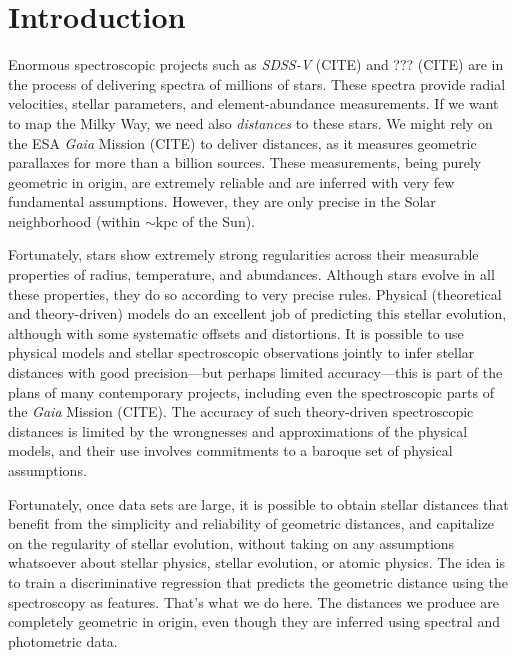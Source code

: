 \documentclass[modern]{aastex631}
\newcommand{\acronym}[1]{{\small{#1}}}
\newcommand{\project}[1]{\textsl{#1}}
\newcommand{\Gaia}{\project{Gaia}}
\newcommand{\SDSSV}{\project{\acronym{SDSS-V}}}
\begin{document}

\section{Introduction}\label{sec:intro}

Enormous spectroscopic projects such as \SDSSV{} (CITE)
and ??? (CITE)
are in the process of delivering spectra of millions of stars.
These spectra provide radial velocities, stellar parameters, and element-abundance
measurements.
If we want to map the Milky Way, we need also \emph{distances} to these stars.
We might rely on the ESA \Gaia{} Mission (CITE) to deliver distances, as it measures
geometric parallaxes for more than a billion sources.
These measurements, being purely geometric in origin, are extremely reliable
and are inferred with very few fundamental assumptions.
However, they are only precise in the Solar neighborhood (within $\sim$kpc of the Sun).

Fortunately, stars show extremely strong regularities across their measurable
properties of radius, temperature, and abundances.
Although stars evolve in all these properties, they do so according to very
precise rules.
Physical (theoretical and theory-driven) models do an excellent job of predicting
this stellar evolution, although with some systematic offsets and distortions.
It is possible to use physical models and stellar spectroscopic observations
jointly to infer stellar distances with good precision---but perhaps limited
accuracy---this is part of the plans of many contemporary projects, including even
the spectroscopic parts of the \Gaia{} Mission (CITE).
The accuracy of such theory-driven spectroscopic distances is limited by the
wrongnesses and approximations of the physical models, and their use involves
commitments to a baroque set of physical assumptions.

Fortunately, once data sets are large, it is possible to obtain stellar distances
that benefit from the simplicity and reliability of geometric distances, and
capitalize on the regularity of stellar evolution, without taking on any assumptions
whatsoever about stellar physics, stellar evolution, or atomic physics.
The idea is to train a discriminative regression that predicts the geometric
distance using the spectroscopy as features.
That's what we do here.
The distances we produce are completely geometric in origin, even though they
are inferred using spectral and photometric data.
\end{document}
